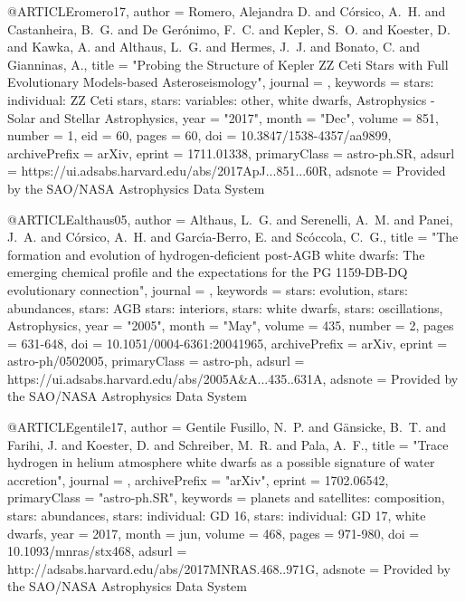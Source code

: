 \documentclass[a4paper,fleqn,usenatbib]{mnras}
\begin{document}
@ARTICLE{romero17,
       author = {{Romero}, Alejandra D. and {C{\'o}rsico}, A.~H. and
         {Castanheira}, B.~G. and {De Ger{\'o}nimo}, F.~C. and {Kepler}, S.~O. and
         {Koester}, D. and {Kawka}, A. and {Althaus}, L.~G. and {Hermes}, J.~J. and
         {Bonato}, C. and {Gianninas}, A.},
        title = "{Probing the Structure of Kepler ZZ Ceti Stars with Full Evolutionary Models-based Asteroseismology}",
      journal = {\apj},
     keywords = {stars: individual: ZZ Ceti stars, stars: variables: other, white dwarfs, Astrophysics - Solar and Stellar Astrophysics},
         year = "2017",
        month = "Dec",
       volume = {851},
       number = {1},
          eid = {60},
        pages = {60},
          doi = {10.3847/1538-4357/aa9899},
archivePrefix = {arXiv},
       eprint = {1711.01338},
 primaryClass = {astro-ph.SR},
       adsurl = {https://ui.adsabs.harvard.edu/abs/2017ApJ...851...60R},
      adsnote = {Provided by the SAO/NASA Astrophysics Data System}
}


@ARTICLE{althaus05,
       author = {{Althaus}, L.~G. and {Serenelli}, A.~M. and {Panei}, J.~A. and
         {C{\'o}rsico}, A.~H. and {Garc{\'\i}a-Berro}, E. and
         {Sc{\'o}ccola}, C.~G.},
        title = "{The formation and evolution of hydrogen-deficient post-AGB white dwarfs: The emerging chemical profile and the expectations for the PG 1159-DB-DQ evolutionary connection}",
      journal = {\aap},
     keywords = {stars: evolution, stars: abundances, stars: AGB stars: interiors, stars: white dwarfs, stars: oscillations, Astrophysics},
         year = "2005",
        month = "May",
       volume = {435},
       number = {2},
        pages = {631-648},
          doi = {10.1051/0004-6361:20041965},
archivePrefix = {arXiv},
       eprint = {astro-ph/0502005},
 primaryClass = {astro-ph},
       adsurl = {https://ui.adsabs.harvard.edu/abs/2005A&A...435..631A},
      adsnote = {Provided by the SAO/NASA Astrophysics Data System}
}


@ARTICLE{gentile17,
   author = {{Gentile Fusillo}, N.~P. and {G{\"a}nsicke}, B.~T. and {Farihi}, J. and 
	{Koester}, D. and {Schreiber}, M.~R. and {Pala}, A.~F.},
    title = "{Trace hydrogen in helium atmosphere white dwarfs as a possible signature of water accretion}",
  journal = {\mnras},
archivePrefix = "arXiv",
   eprint = {1702.06542},
 primaryClass = "astro-ph.SR",
 keywords = {planets and satellites: composition, stars: abundances, stars: individual: GD 16, stars: individual: GD 17, white dwarfs},
     year = 2017,
    month = jun,
   volume = 468,
    pages = {971-980},
      doi = {10.1093/mnras/stx468},
   adsurl = {http://adsabs.harvard.edu/abs/2017MNRAS.468..971G},
  adsnote = {Provided by the SAO/NASA Astrophysics Data System}
}
\end{document}
